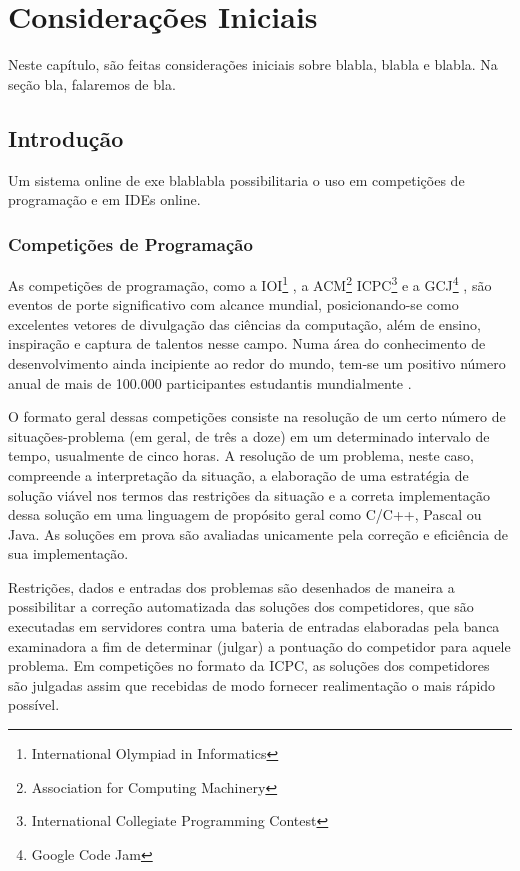 \documentclass[ruledheader]{abnt}
\begin{document}
\tableofcontents

\listoffigures

\listoftables

\chapter{Considerações Iniciais}

Neste capítulo, são feitas considerações iniciais sobre blabla, blabla e blabla. Na seção bla, falaremos de bla.

\section{Introdução}

Um sistema online de exe blablabla possibilitaria o uso em competições de programação e em IDEs online.

\subsection{Competições de Programação}

As competições de programação, como a IOI\footnote{International Olympiad in Informatics} \cite{ioinformatics}, a ACM\footnote{Association for Computing Machinery} ICPC\footnote{International Collegiate Programming Contest} \cite{acmicpc} e a GCJ\footnote{Google Code Jam} \cite{googlecodejam}, são eventos de porte significativo com alcance mundial, posicionando-se como excelentes vetores de divulgação das ciências da computação, além de ensino, inspiração e captura de talentos nesse campo. Numa área do conhecimento de desenvolvimento ainda incipiente ao redor do mundo, tem-se um positivo número anual de mais de 100.000 participantes estudantis mundialmente \cite{icpcfactsheet,wang2010selection}.

O formato geral dessas competições consiste na resolução de um certo número de situações-problema (em geral, de três a doze) em um determinado intervalo de tempo, usualmente de cinco horas. A resolução de um problema, neste caso, compreende a interpretação da situação, a elaboração de uma estratégia de solução viável nos termos das restrições da situação e a correta implementação dessa solução em uma linguagem de propósito geral como C/C++, Pascal ou Java. As soluções em prova são avaliadas unicamente pela correção e eficiência de sua implementação. 

Restrições, dados e entradas dos problemas são desenhados de maneira a possibilitar a correção automatizada das soluções dos competidores, que são executadas em servidores contra uma bateria de entradas elaboradas pela banca examinadora a fim de determinar (julgar) a pontuação do competidor para aquele problema. Em competições no formato da ICPC, as soluções dos competidores são julgadas assim que recebidas de modo fornecer realimentação o mais rápido possível.
\end{document}
